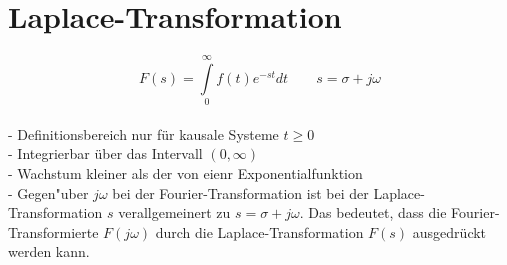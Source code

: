 \newpage
\section{Laplace-Transformation}
	$$\boxed{F(s)=\int\limits_0^\infty f(t)e^{-st}dt} \qquad s=\sigma+j\omega$$\\
	- Definitionsbereich nur für kausale Systeme $t\geq 0$\\
	- Integrierbar über das Intervall $(0,\infty)$\\
	- Wachstum kleiner als der von eienr Exponentialfunktion\\ 
	- Gegen"uber $j\omega$ bei der Fourier-Transformation ist bei der
	Laplace-Transformation $s$ verallgemeinert zu $s=\sigma + j\omega$. Das
	bedeutet, dass die Fourier-Transformierte $F(j\omega)$ durch die
	Laplace-Transformation $F(s)$ ausgedr\"uckt werden kann.  	
  
